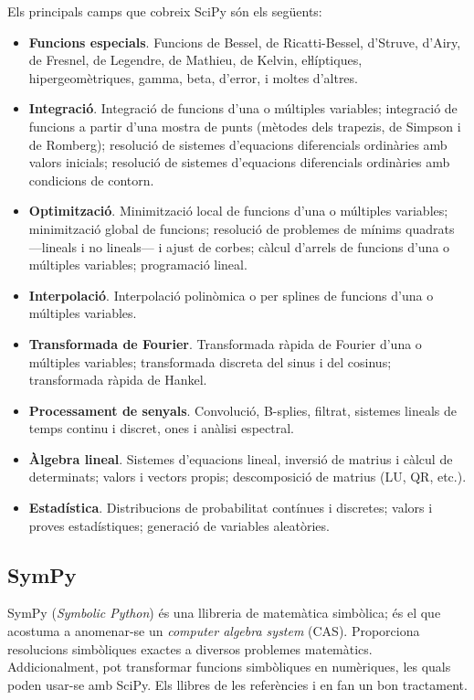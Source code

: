 Els principals camps  que cobreix SciPy són els següents:
\begin{itemize}
	\item \textbf{Funcions especials}. Funcions de Bessel, de Ricatti-Bessel, d'Struve,  d'Airy, de Fresnel, de Legendre, de Mathieu, de Kelvin, eŀlíptiques, hipergeomètriques, gamma, beta, d'error,  i moltes d'altres.
	\item \textbf{Integració}. Integració de funcions d'una o múltiples variables; integració de funcions a partir d'una mostra de punts (mètodes dels trapezis, de Simpson i de Romberg); resolució de sistemes d'equacions diferencials ordinàries amb valors inicials; resolució de sistemes d'equacions diferencials ordinàries amb condicions de contorn.
	\item \textbf{Optimització}. Minimització local de funcions d'una o múltiples variables; minimització global de funcions; resolució de problemes de mínims quadrats ---lineals i no lineals--- i ajust de corbes; càlcul d'arrels de funcions d'una o múltiples variables;  programació lineal.
	\item \textbf{Interpolació}. Interpolació polinòmica o per splines de funcions d'una o múltiples variables.
	\item \textbf{Transformada de Fourier}. Transformada ràpida de Fourier d'una o múltiples variables; transformada discreta del sinus i del cosinus; transformada ràpida de Hankel.
	\item \textbf{Processament de senyals}. Convolució, B-splies, filtrat, sistemes lineals de temps continu i discret, ones i anàlisi espectral.
	\item \textbf{Àlgebra lineal}. Sistemes d'equacions lineal, inversió de matrius i càlcul de determinats; valors i vectors propis; descomposició de matrius (LU, QR, etc.).
	\item \textbf{Estadística}. Distribucions de probabilitat contínues i discretes; valors i proves estadístiques; generació de variables aleatòries.
\end{itemize}


\subsection{SymPy}

SymPy (\textit{Symbolic Python}) és una llibreria de matemàtica simbòlica; és el que acostuma a anomenar-se un \textit{computer algebra system} (CAS). Proporciona resolucions simbòliques exactes a diversos problemes matemàtics. Addicionalment, pot transformar funcions simbòliques en numèriques, les quals poden usar-se amb SciPy. Els llibres de les referències \cite{JOH} i \cite{HIL} en fan un bon tractament.


